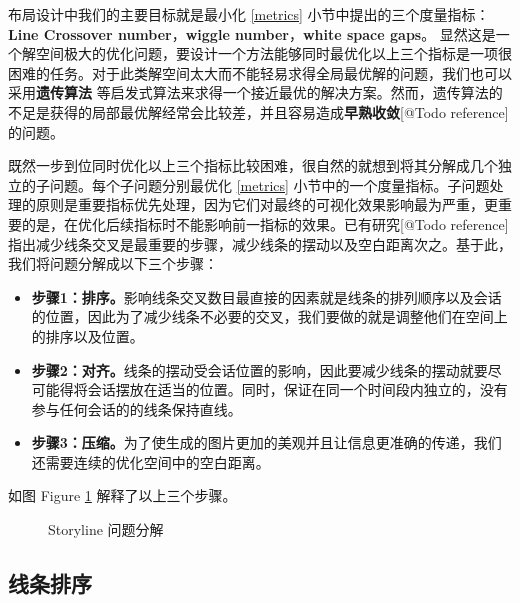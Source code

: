 布局设计中我们的主要目标就是最小化 \ref{metrics} 小节中提出的三个度量指标：\textbf{Line Crossover number}，\textbf{wiggle number}，\textbf{white space gaps}。 显然这是一个解空间极大的优化问题，要设计一个方法能够同时最优化以上三个指标是一项很困难的任务。对于此类解空间太大而不能轻易求得全局最优解的问题，我们也可以采用\textbf{遗传算法}\cite{tanahashi2012design} 等启发式算法来求得一个接近最优的解决方案。然而，遗传算法的不足是获得的局部最优解经常会比较差，并且容易造成\textbf{早熟收敛}[@Todo reference]的问题。

既然一步到位同时优化以上三个指标比较困难，很自然的就想到将其分解成几个独立的子问题。每个子问题分别最优化 \ref{metrics} 小节中的一个度量指标。子问题处理的原则是重要指标优先处理，因为它们对最终的可视化效果影响最为严重，更重要的是，在优化后续指标时不能影响前一指标的效果。已有研究[@Todo reference]指出减少线条交叉是最重要的步骤，减少线条的摆动以及空白距离次之。基于此，我们将问题分解成以下三个步骤：
\begin{itemize}
\item \textbf{步骤1：排序。}影响线条交叉数目最直接的因素就是线条的排列顺序以及会话的位置，因此为了减少线条不必要的交叉，我们要做的就是调整他们在空间上的排序以及位置。
\item \textbf{步骤2：对齐。}线条的摆动受会话位置的影响，因此要减少线条的摆动就要尽可能得将会话摆放在适当的位置。同时，保证在同一个时间段内独立的，没有参与任何会话的的线条保持直线。
\item \textbf{步骤3：压缩。}为了使生成的图片更加的美观并且让信息更准确的传递，我们还需要连续的优化空间中的空白距离。
\end{itemize}
如图 Figure \ref{fig:layout-steps} 解释了以上三个步骤。
\begin{figure}[h]
  \caption{Storyline 问题分解}
  \label{fig:layout-steps}
\end{figure}
 
\subsection{线条排序}

